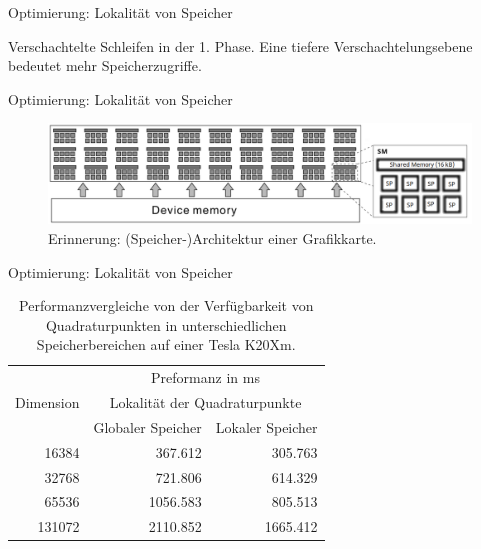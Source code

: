 \documentclass[10pt]{beamer}
\begin{document}
\begin{frame}{Optimierung: Lokalität von Speicher}
  \begin{algorithm}[H]
    \begin{algorithmic}[1]
      \normalsize
      {
          \EndFor{}
        \EndFor{}
      \EndFor{}
      \EndFunction{}
      }
    \end{algorithmic}
    \caption{Verschachtelte Schleifen in der 1. Phase. Eine tiefere
             Verschachtelungsebene bedeutet mehr Speicherzugriffe.}
  \end{algorithm}
\end{frame}

\begin{frame}{Optimierung: Lokalität von Speicher}
  \begin{figure}
    \centering
    \includegraphics[width=\linewidth]{figures/fg-gpu_architecture.png}
    \caption{Erinnerung: (Speicher-)Architektur einer Grafikkarte.}
  \end{figure}
\end{frame}

\begin{frame}{Optimierung: Lokalität von Speicher}
  \small
  \begin{table}
    \begin{tabular}{rrr} \toprule
      \multirow{3}{*}{Dimension} & \multicolumn{2}{c}{Preformanz in ms} \\ \cmidrule{2-3}
      & \multicolumn{2}{c}{Lokalität der Quadraturpunkte} \\ \cmidrule{2-3}
      & Globaler Speicher & Lokaler Speicher \\ \cmidrule{1-3}
       16384 &  367.612 & 305.763  \\ %
       32768 &  721.806 & 614.329  \\
       65536 & 1056.583 & 805.513  \\
      131072 & 2110.852 & 1665.412 \\
      \bottomrule
    \end{tabular}
    \caption{Performanzvergleiche von der Verfügbarkeit von Quadraturpunkten
             in unterschiedlichen Speicherbereichen auf einer Tesla K20Xm.}
  \end{table}
  \normalsize
\end{frame}
\end{document}
